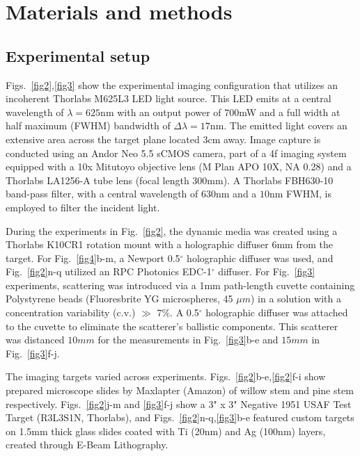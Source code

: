 \documentclass[pdflatex,sn-mathphys-num]{sn-jnl}%
\theoremstyle{thmstyleone}%
\theoremstyle{thmstyletwo}%
\theoremstyle{thmstylethree}%
\begin{document}
\section*{Materials and methods}

\subsection*{Experimental setup}

Figs.~\ref{fig2},\ref{fig3} show the experimental imaging configuration that utilizes an incoherent Thorlabs M625L3 LED light source. This LED emits at a central wavelength of $\lambda = 625$nm with an output power of 700mW and a full width at half maximum (FWHM) bandwidth of $\Delta \lambda = 17$nm. The emitted light covers an extensive area across the target plane located 3cm away. Image capture is conducted using an Andor Neo 5.5 sCMOS camera, part of a 4f imaging system equipped with a 10x Mitutoyo objective lens (M Plan APO 10X, NA 0.28) and a Thorlabs LA1256-A tube lens (focal length $300$mm). A Thorlabs FBH630-10 band-pass filter, with a central wavelength of $630$nm and a $10$nm FWHM, is employed to filter the incident light.

During the experiments in Fig.~\ref{fig2}, the dynamic media was created using a Thorlabs K10CR1 rotation mount with a holographic diffuser 6mm from the target. For Fig.~\ref{fig4}b-m, a Newport 0.5$^\circ$ holographic diffuser was used, and Fig.~\ref{fig2}n-q utilized an RPC Photonics EDC-1$^\circ$ diffuser.
For Fig.~\ref{fig3} experiments, scattering was introduced via a 1mm path-length cuvette containing Polystyrene beads (Fluoresbrite YG microspheres, 45 $\mu m$) in a solution with a concentration variability (c.v.) $\gg$ 7\%. A 0.5$^\circ$ holographic diffuser was attached to the cuvette to eliminate the scatterer's ballistic components. This scatterer was distanced $10mm$ for the measurements in Fig.~\ref{fig3}b-e and $15mm$ in Fig.~\ref{fig3}f-j.

The imaging targets varied across experiments. Figs.~\ref{fig2}b-e,\ref{fig2}f-i show prepared microscope slides by Maxlapter (Amazon) of willow stem and pine stem respectively. Figs.~\ref{fig2}j-m and \ref{fig3}f-j show a 3" x 3" Negative 1951 USAF Test Target (R3L3S1N, Thorlabs), and Figs.~\ref{fig2}n-q,\ref{fig3}b-e featured custom targets on 1.5mm thick glass slides coated with Ti (20nm) and Ag (100nm) layers, created through E-Beam Lithography.
\end{document}

